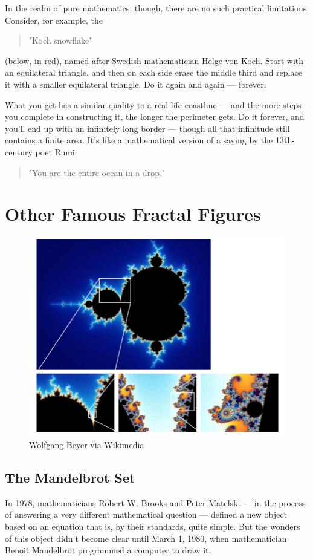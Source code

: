 \documentclass{article}
\begin{document}
In the realm of pure mathematics, though, there are no such practical limitations. Consider, for example, the \begin{quote}"Koch snowflake"\end{quote} (below, in red), named after Swedish mathematician Helge von Koch. Start with an equilateral triangle, and then on each side erase the middle third and replace it with a smaller equilateral triangle. Do it again and again — forever.

What you get has a similar quality to a real-life coastline — and the more steps you complete in constructing it, the longer the perimeter gets. Do it forever, and you’ll end up with an infinitely long border — though all that infinitude still contains a finite area. It’s like a mathematical version of a saying by the 13th-century poet Rumi: \begin{quote}"You are the entire ocean in a drop."\end{quote}
\section{Other Famous Fractal Figures}
\begin{figure}[H]
\includegraphics[scale=0.43]{ScreenShot20180605at21515PM.jpg}
\caption{Wolfgang Beyer via Wikimedia}
\end{figure}
\subsection{The Mandelbrot Set }
In 1978, mathematicians Robert W. Brooks and Peter Matelski — in the process of answering a very different mathematical question — defined a new object based on an equation that is, by their standards, quite simple. But the wonders of this object didn’t become clear until March 1, 1980, when mathematician Benoit Mandelbrot programmed a computer to draw it.
\end{document}
